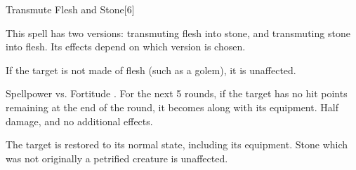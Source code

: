 \begin{spellsection}{Transmute Flesh and Stone}[6]
    \begin{spellheader}
    \end{spellheader}
    \begin{spellcontent}
        \begin{spelltargetinginfo}
            \spellspecial This spell has two versions: transmuting flesh into stone, and transmuting stone into flesh. Its effects depend on which version is chosen.
        \end{spelltargetinginfo}
    \end{spellcontent}
    \begin{spellsubcontent}
        \begin{spelltargetinginfo}
        \end{spelltargetinginfo}
        \begin{spelleffects}
            \spellspecial If the target is not made of flesh (such as a golem), it is unaffected.
            \begin{spellattack}{Spellpower vs. Fortitude}
                \spellsuccess {}. For the next 5 rounds, if the target has no hit points remaining at the end of the round, it becomes \petrified along with its equipment.
                \spellfailure Half damage, and no additional effects.
            \end{spellattack}
        \end{spelleffects}
    \end{spellsubcontent}
    \begin{spellsubcontent}
        \begin{spelltargetinginfo}
        \end{spelltargetinginfo}
        \begin{spelleffects}
            \spelleffect The target is restored to its normal state, including its equipment. Stone which was not originally a petrified creature is unaffected.
        \end{spelleffects}
    \end{spellsubcontent}
    \begin{spellfooter}
        \miscastrandom
    \end{spellfooter}
\end{spellsection}

